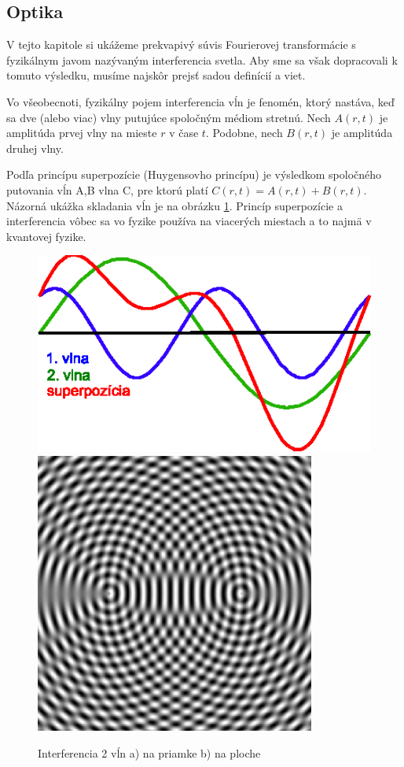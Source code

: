 \subsection{Optika}
 \todo{}

V tejto kapitole si ukážeme prekvapivý súvis Fourierovej transformácie
s fyzikálnym javom nazývaným interferencia svetla. Aby sme sa však
dopracovali k tomuto výsledku, musíme najskôr prejsť sadou definícií a
viet.

Vo všeobecnoti, fyzikálny pojem interferencia vĺn je fenomén, ktorý
nastáva, keď sa dve (alebo viac) vlny putujúce spoločným médiom
stretnú. Nech $A(r,t)$ je amplitúda prvej vlny na mieste $r$ v čase $t$.
Podobne, nech $B(r,t)$ je amplitúda druhej vlny.

Podľa princípu superpozície (Huygensovho princípu) je výsledkom
spoločného putovania vĺn A,B vlna C, pre ktorú platí
 $C(r,t)=A(r,t)+B(r,t)$. Názorná ukážka skladania vĺn je na obrázku
 \ref{fig:interferencia}.
Princíp superpozície a interferencia vôbec sa vo
 fyzike používa na viacerých miestach a to najmä v kvantovej fyzike.

 \begin{figure}[htp]
 \centering
 \includegraphics{obrazky/optika/interferencia_1}
 \includegraphics{obrazky/optika/interferencia_2}

 \caption{Interferencia 2 vĺn a) na priamke b) na ploche}
 \label{fig:interferencia}
 \end{figure}

